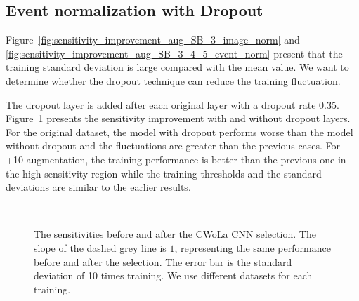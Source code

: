 \documentclass[12pt]{article}
\begin{document}
    \subsection{Event normalization with Dropout}%
    \label{sub:event_normalization_with_dropout}
        Figure~\ref{fig:sensitivity_improvement_aug_SB_3_image_norm} and \ref{fig:sensitivity_improvement_aug_SB_3_4_5_event_norm} present that the training standard deviation is large compared with the mean value. We want to determine whether the dropout technique can reduce the training fluctuation.

        The dropout layer is added after each original layer with a dropout rate 0.35. Figure~\ref{fig:sensitivity_improvement_origin_pt_jet_aug_10_event_norm_dp_035} presents the sensitivity improvement with and without dropout layers. For the original dataset, the model with dropout performs worse than the model without dropout and the fluctuations are greater than the previous cases. For +10 augmentation, the training performance is better than the previous one in the high-sensitivity region while the training thresholds and the standard deviations are similar to the earlier results.
        \begin{figure}[htpb]
            \centering
             \\
            \caption{The sensitivities before and after the CWoLa CNN selection. The slope of the dashed grey line is $1$, representing the same performance before and after the selection. The error bar is the standard deviation of 10 times training. We use different datasets for each training.}
            \label{fig:sensitivity_improvement_origin_pt_jet_aug_10_event_norm_dp_035}
        \end{figure}
\end{document}
